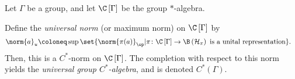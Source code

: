 \begin{proposition}\label{prop:universal_group_cstar_algebra}
  Let $\Gamma$ be a group, and let $\C\left[ \Gamma \right]$ be the group $\ast$-algebra.\newline

  Define the \textit{universal norm} (or maximum norm) on $\C\left[ \Gamma \right]$ by
  \begin{align*}
    \norm{a}_{u} &\coloneq \sup\set{\norm{\pi(a)}_{\op} | \pi\colon \C\left[ \Gamma \right]\rightarrow \B\left( \mathcal{H}_{\pi} \right)\text{ is a unital representation}}.
  \end{align*}
  Then, this is a $C^{\ast}$-norm on $\C\left[ \Gamma \right]$. The completion with respect to this norm yields the \textit{universal group $C^{\ast}$-algebra}, and is denoted $C^{\ast}\left( \Gamma \right)$.
\end{proposition}
